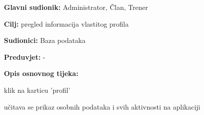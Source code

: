					\noindent {}
					\begin{packed_item}
	
						\item \textbf{Glavni sudionik: }Administrator, Član, Trener
						\item  \textbf{Cilj: } pregled informacija vlastitog profila
						\item  \textbf{Sudionici: } Baza podataka
						\item  \textbf{Preduvjet: } -
						\item  \textbf{Opis osnovnog tijeka:}
						
						\item[] \begin{packed_enum}
	
							\item klik na karticu 'profil'
							\item učitava se prikaz osobnih podataka i svih aktivnosti na aplikaciji
							
						\end{packed_enum}
					\end{packed_item}
					

